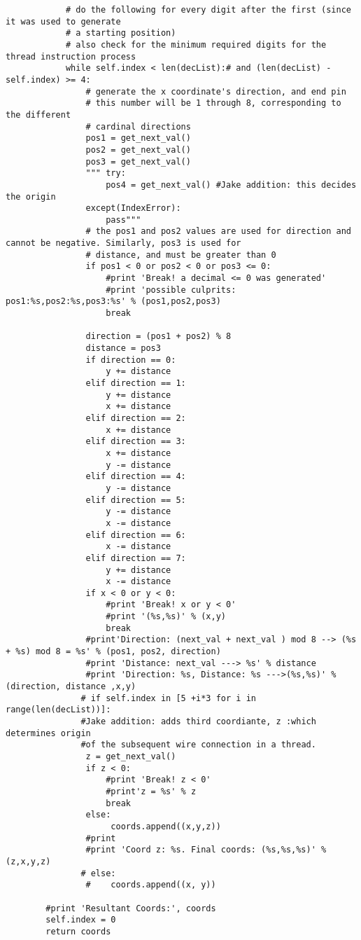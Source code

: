 \documentclass[a4paper]{article}
\begin{document}
\begin{verbatim}
            # do the following for every digit after the first (since it was used to generate
            # a starting position)
            # also check for the minimum required digits for the thread instruction process
            while self.index < len(decList):# and (len(decList) - self.index) >= 4:
                # generate the x coordinate's direction, and end pin
                # this number will be 1 through 8, corresponding to the different
                # cardinal directions
                pos1 = get_next_val()
                pos2 = get_next_val()
                pos3 = get_next_val()
                """ try:
                    pos4 = get_next_val() #Jake addition: this decides the origin
                except(IndexError):
                    pass"""
                # the pos1 and pos2 values are used for direction and cannot be negative. Similarly, pos3 is used for
                # distance, and must be greater than 0
                if pos1 < 0 or pos2 < 0 or pos3 <= 0:
                    #print 'Break! a decimal <= 0 was generated'
                    #print 'possible culprits: pos1:%s,pos2:%s,pos3:%s' % (pos1,pos2,pos3)
                    break

                direction = (pos1 + pos2) % 8
                distance = pos3
                if direction == 0:
                    y += distance
                elif direction == 1:
                    y += distance
                    x += distance
                elif direction == 2:
                    x += distance
                elif direction == 3:
                    x += distance
                    y -= distance
                elif direction == 4:
                    y -= distance
                elif direction == 5:
                    y -= distance
                    x -= distance
                elif direction == 6:
                    x -= distance
                elif direction == 7:
                    y += distance
                    x -= distance
                if x < 0 or y < 0:
                    #print 'Break! x or y < 0'
                    #print '(%s,%s)' % (x,y)
                    break
                #print'Direction: (next_val + next_val ) mod 8 --> (%s + %s) mod 8 = %s' % (pos1, pos2, direction)
                #print 'Distance: next_val ---> %s' % distance
                #print 'Direction: %s, Distance: %s --->(%s,%s)' % (direction, distance ,x,y)
               # if self.index in [5 +i*3 for i in range(len(decList))]:
               #Jake addition: adds third coordiante, z :which determines origin
               #of the subsequent wire connection in a thread.
                z = get_next_val()
                if z < 0:
                    #print 'Break! z < 0'
                    #print'z = %s' % z
                    break
                else:
                     coords.append((x,y,z))
                #print
                #print 'Coord z: %s. Final coords: (%s,%s,%s)' % (z,x,y,z)
               # else:
                #    coords.append((x, y))

        #print 'Resultant Coords:', coords
        self.index = 0
        return coords
\end{verbatim}
\end{document}
